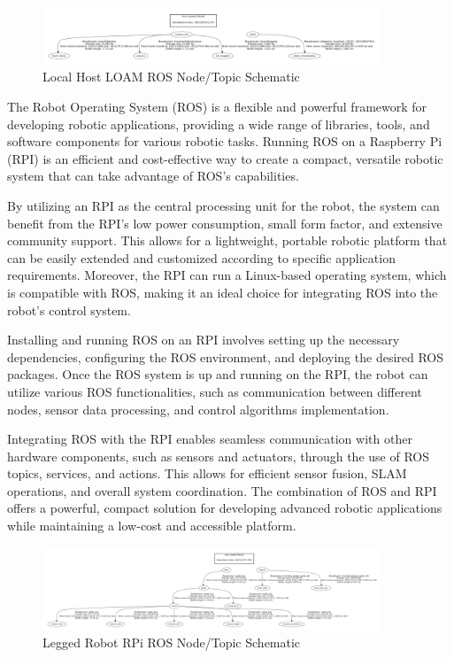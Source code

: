 \documentclass[12pt]{article}
\begin{document}
\begin{figure}[h]
    \centering
    \includegraphics[width=0.9\textwidth]{loam_ros_graph.png}
    \caption{Local Host LOAM ROS Node/Topic Schematic}
\end{figure}

The Robot Operating System (ROS) is a flexible and powerful framework for developing robotic applications, providing a wide range of libraries, tools, and software components for various robotic tasks. Running ROS on a Raspberry Pi (RPI) is an efficient and cost-effective way to create a compact, versatile robotic system that can take advantage of ROS's capabilities.

By utilizing an RPI as the central processing unit for the robot, the system can benefit from the RPI's low power consumption, small form factor, and extensive community support. This allows for a lightweight, portable robotic platform that can be easily extended and customized according to specific application requirements. Moreover, the RPI can run a Linux-based operating system, which is compatible with ROS, making it an ideal choice for integrating ROS into the robot's control system.

Installing and running ROS on an RPI involves setting up the necessary dependencies, configuring the ROS environment, and deploying the desired ROS packages. Once the ROS system is up and running on the RPI, the robot can utilize various ROS functionalities, such as communication between different nodes, sensor data processing, and control algorithms implementation.

Integrating ROS with the RPI enables seamless communication with other hardware components, such as sensors and actuators, through the use of ROS topics, services, and actions. This allows for efficient sensor fusion, SLAM operations, and overall system coordination. The combination of ROS and RPI offers a powerful, compact solution for developing advanced robotic applications while maintaining a low-cost and accessible platform.

\begin{figure}[h]
    \centering
    \includegraphics[width=0.9\textwidth]{rpi_ros_graph.png}
    \caption{Legged Robot RPi ROS Node/Topic Schematic}
\end{figure}
    
\end{document}
